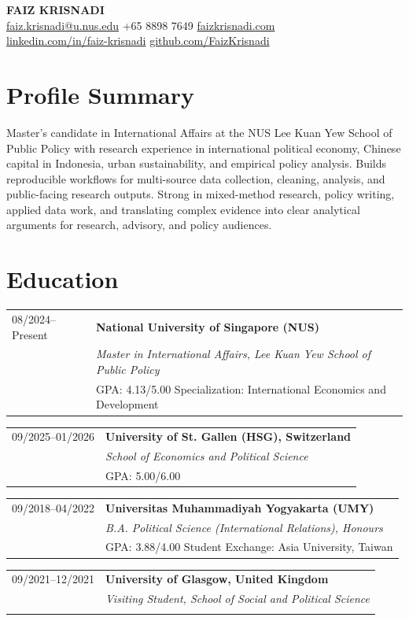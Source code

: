 \documentclass[10pt,a4paper]{article}
\makeatletter
\newcommand{\cvsection}[1]{\section*{#1}}
\newcommand{\entry}[4]{%
  \begin{tabularx}{\textwidth}{@{}p{0.17\textwidth}X@{}}
    \textcolor{muted}{#1} & \textbf{#2}\\
    & \textit{#3}\\
    & #4
  \end{tabularx}\vspace{5pt}
}
\makeatother
\begin{document}
\color{text}

{\LARGE \textbf{FAIZ KRISNADI}}\\[3pt]
\small
\href{mailto:faiz.krisnadi@u.nus.edu}{faiz.krisnadi@u.nus.edu}
\; \textbar{} \; +65 8898 7649
\; \textbar{} \; \href{https://faizkrisnadi.com}{faizkrisnadi.com}\\
\href{https://linkedin.com/in/faiz-krisnadi}{linkedin.com/in/faiz-krisnadi}
\; \textbar{} \; \href{https://github.com/FaizKrisnadi}{github.com/FaizKrisnadi}
\normalsize

\cvsection{Profile Summary}
Master's candidate in International Affairs at the NUS Lee Kuan Yew School of Public Policy with research experience in international political economy, Chinese capital in Indonesia, urban sustainability, and empirical policy analysis. Builds reproducible workflows for multi-source data collection, cleaning, analysis, and public-facing research outputs. Strong in mixed-method research, policy writing, applied data work, and translating complex evidence into clear analytical arguments for research, advisory, and policy audiences.

\cvsection{Education}
\entry{08/2024--Present}{National University of Singapore (NUS)}{Master in International Affairs, Lee Kuan Yew School of Public Policy}{GPA: 4.13/5.00 \textbar{} Specialization: International Economics and Development}
\entry{09/2025--01/2026}{University of St. Gallen (HSG), Switzerland}{School of Economics and Political Science}{GPA: 5.00/6.00}
\entry{09/2018--04/2022}{Universitas Muhammadiyah Yogyakarta (UMY)}{B.A. Political Science (International Relations), Honours}{GPA: 3.88/4.00 \textbar{} Student Exchange: Asia University, Taiwan}
\entry{09/2021--12/2021}{University of Glasgow, United Kingdom}{Visiting Student, School of Social and Political Science}{}
\end{document}
